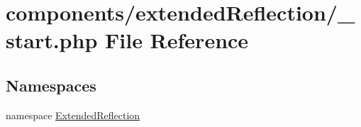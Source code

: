\hypertarget{components_2extended_reflection_2__start_8php}{
\section{components/extendedReflection/\_\-start.php File Reference}
\label{components_2extended_reflection_2__start_8php}
}
\subsection*{Namespaces}
\begin{CompactItemize}
\item 
namespace \hyperlink{namespace_extended_reflection}{ExtendedReflection}
\end{CompactItemize}
